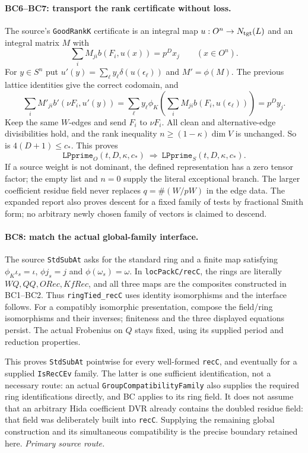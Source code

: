\documentclass[11pt,a4paper]{article}
\numberwithin{equation}{section}
\theoremstyle{remark}\newtheorem{remark}[theorem]{Remark}
\begin{document}
\paragraph{BC6--BC7: transport the rank certificate without loss.}
The source's \texttt{GoodRankK} certificate is an integral map
$u:O^n\to N_{\rm tgt}(L)$ and an integral matrix $M$ with
\[
 \sum_i M_{ji}b(F_i,u(x))=p^Dx_j\qquad(x\in O^n).
\]
For $y\in S^n$ put $u'(y)=\sum_\ell y_\ell\delta(u(\epsilon_\ell))$
and $M'=\phi(M)$. The previous lattice identities give the correct
codomain, and
\[
 \sum_iM'_{ji}b'(\nu F_i,u'(y))
 =\sum_\ell y_\ell\phi_K\!\left(
         \sum_iM_{ji}b(F_i,u(\epsilon_\ell))\right)=p^Dy_j.
                                                               \tag{BC.11}
\]
Keep the same $W$-edges and send $F_i$ to $\nu F_i$. All clean
and alternative-edge divisibilities hold, and the rank inequality
$n\ge(1-\kappa)\dim V$ is unchanged. So is $4(D+1)\le c_*$.
This proves
\[
 \texttt{LPprime}_{O}(t,D,\kappa,c_*)
 \ \Longrightarrow\
 \texttt{LPprime}_{S}(t,D,\kappa,c_*).                    \tag{BC.12}
\]
If a source weight is not dominant, the defined representation has a
zero tensor factor; the empty list and $n=0$ supply the literal
exceptional branch. The larger coefficient residue field never replaces
$q=\#(W/pW)$ in the edge data. The expanded report also proves descent
for a fixed family of tests by fractional Smith form; no arbitrary newly
chosen family of vectors is claimed to descend.

\paragraph{BC8: match the actual global-family interface.}
The source \texttt{StdSubAt} asks for the standard ring and a finite map
satisfying $\phi_K\iota_s=\iota$, $\phi j_s=j$ and
$\phi(\omega_s)=\omega$. In \texttt{locPackC/recC}, the rings are
literally $WQ,QQ,ORec,KfRec$, and all three maps are the composites
constructed in BC1--BC2. Thus \texttt{ringTied\_recC} uses identity
isomorphisms and the interface follows. For a compatibly isomorphic
presentation, compose the field/ring isomorphisms and their inverses;
finiteness and the three displayed equations persist. The actual
Frobenius on $Q$ stays fixed, using its supplied period and reduction
properties.

This proves \texttt{StdSubAt} pointwise for every well-formed
\texttt{recC}, and eventually for a supplied \texttt{IsRecCEv} family.
The latter is one sufficient identification, not a necessary route:
an actual \texttt{GroupCompatibilityFamily} also supplies the required
ring identifications directly, and BC applies to its ring field.
It does not assume that an arbitrary Hida coefficient DVR already
contains the doubled residue field: that field was deliberately built
into \texttt{recC}. Supplying the remaining global construction and its
simultaneous compatibility is the precise boundary retained here.
\noindent\textit{Primary source route.}\cite{finite-base-change}
\end{document}
